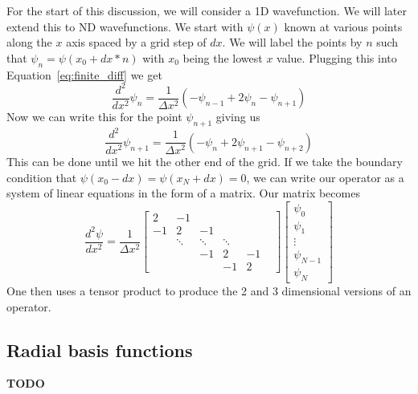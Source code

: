 For the start of this discussion, we will consider a 1D wavefunction. We will later extend this to ND wavefunctions. We start with $\psi(x)$ known at various points along the $x$ axis spaced by a grid step of $dx$. We will label the points by $n$ such that $\psi_n = \psi(x_0 + dx*n)$ with $x_0$ being the lowest $x$ value. Plugging this into Equation~\ref{eq:finite_diff} we get
\begin{equation}
    \frac{d^2}{dx^2}\psi_n = \frac{1}{\Delta x^2}\left(-\psi_{n-1}+2\psi_n-\psi_{n+1} \right)
    \label{eq:finite_diff_second_order}
\end{equation}
Now we can write this for the point $\psi_{n+1}$ giving us
\begin{equation}
    \frac{d^2}{dx^2}\psi_{n+1} = \frac{1}{\Delta x^2}\left(-\psi_{n}+2\psi_{n+1}-\psi_{n+2} \right)
    \label{eq:finite_diff_second_order_n+1}
\end{equation}
This can be done until we hit the other end of the grid. If we take the boundary condition that $\psi(x_0-dx)=\psi(x_N+dx)=0$, we can write our operator as a system of linear equations in the form of a matrix. Our matrix becomes
\begin{equation}
\frac{d^2\psi}{dx^2} =
\frac{1}{\Delta x^2}
\begin{bmatrix}
    2 & -1 &  &  &   &  \\
    -1 & 2 & -1 &  &  &  \\
     & \ddots & \ddots & \ddots & \\
     &  & -1 & 2 & -1\\
     &   &  & -1 & 2
\end{bmatrix}
\begin{bmatrix}
    \psi_{0} \\
    \psi_{1} \\
    \vdots  \\
    \psi_{N-1}  \\
    \psi_{N}
\end{bmatrix}
\end{equation}
One then uses a tensor product to produce the 2 and 3 dimensional versions of an operator.

\subsection{Radial basis functions} %
\label{sub:radial_basis_functions}
\textbf{TODO}

